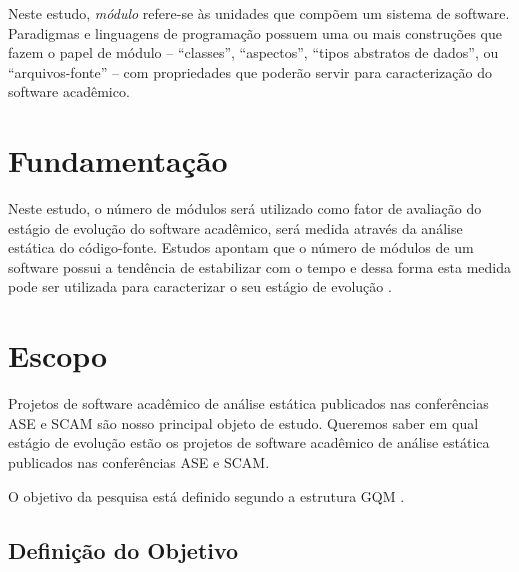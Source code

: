 Neste estudo, \textit{módulo} refere-se \`{a}s unidades que compõem um sistema de software.  
Paradigmas e linguagens de programação possuem uma ou mais
construções que fazem o papel de módulo -- ``classes'', ``aspectos'', ``tipos
abstratos de dados'', ou ``arquivos-fonte'' -- com propriedades que poderão
servir para caracterização do software acadêmico.


\section{Fundamentação} \label{estudo3:fundamentacao}

Neste estudo, o número de módulos será utilizado como fator de avaliação do
estágio de evolução do software acadêmico, será medida através da análise estática
do código-fonte. Estudos apontam que o
número de módulos de um software possui a tendência de estabilizar com o tempo
e dessa forma esta medida pode ser utilizada para caracterizar o seu estágio de
evolução \cite{capiluppi2007adapting}.

\section{Escopo} \label{estudo3:escopo} %

Projetos de software acadêmico de análise estática publicados nas 
conferências ASE e SCAM 
são nosso principal objeto de estudo.
Queremos saber em qual estágio de evolução estão os projetos de software
acadêmico de análise estática publicados nas conferências ASE e SCAM.

O objetivo da pesquisa está definido segundo a estrutura GQM \cite{basili1994goal}.

\subsection{Definição do Objetivo}

